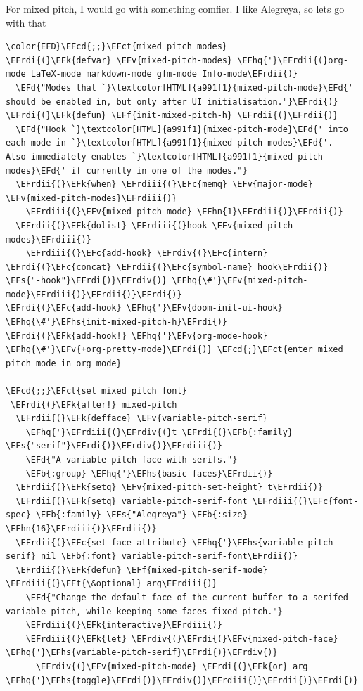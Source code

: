 \documentclass{scrartcl}
\newcommand{\EFk}[1]{\textcolor{EFk}{#1}} %
\newcommand{\EFd}[1]{\textcolor{EFd}{#1}} %
\newcommand{\EFt}[1]{\textcolor{EFt}{#1}} %
\newcommand{\EFs}[1]{\textcolor{EFs}{#1}} %
\newcommand{\EFb}[1]{\textcolor{EFb}{#1}} %
\newcommand{\EFct}[1]{\textcolor{EFct}{#1}} %
\newcommand{\EFc}[1]{\textcolor{EFc}{#1}} %
\newcommand{\EFv}[1]{\textcolor{EFv}{#1}} %
\newcommand{\EFf}[1]{\textcolor{EFf}{#1}} %
\newcommand{\EFcd}[1]{\textcolor{EFcd}{#1}} %
\newcommand{\EFhn}[1]{#1} %
\newcommand{\EFhq}[1]{#1} %
\newcommand{\EFhs}[1]{#1} %
\newcommand{\EFrdi}[1]{#1} %
\newcommand{\EFrdii}[1]{#1} %
\newcommand{\EFrdiii}[1]{#1} %
\newcommand{\EFrdiv}[1]{#1} %
\begin{document}
For mixed pitch, I would go with something comfier. I like Alegreya, so lets go with that
\begin{Code}
\begin{Verbatim}[]
\color{EFD}\EFcd{;;}\EFct{mixed pitch modes}
\EFrdi{(}\EFk{defvar} \EFv{mixed-pitch-modes} \EFhq{'}\EFrdii{(}org-mode LaTeX-mode markdown-mode gfm-mode Info-mode\EFrdii{)}
  \EFd{"Modes that `}\textcolor[HTML]{a991f1}{mixed-pitch-mode}\EFd{' should be enabled in, but only after UI initialisation."}\EFrdi{)}
\EFrdi{(}\EFk{defun} \EFf{init-mixed-pitch-h} \EFrdii{(}\EFrdii{)}
  \EFd{"Hook `}\textcolor[HTML]{a991f1}{mixed-pitch-mode}\EFd{' into each mode in `}\textcolor[HTML]{a991f1}{mixed-pitch-modes}\EFd{'.
Also immediately enables `}\textcolor[HTML]{a991f1}{mixed-pitch-modes}\EFd{' if currently in one of the modes."}
  \EFrdii{(}\EFk{when} \EFrdiii{(}\EFc{memq} \EFv{major-mode} \EFv{mixed-pitch-modes}\EFrdiii{)}
    \EFrdiii{(}\EFv{mixed-pitch-mode} \EFhn{1}\EFrdiii{)}\EFrdii{)}
  \EFrdii{(}\EFk{dolist} \EFrdiii{(}hook \EFv{mixed-pitch-modes}\EFrdiii{)}
    \EFrdiii{(}\EFc{add-hook} \EFrdiv{(}\EFc{intern} \EFrdi{(}\EFc{concat} \EFrdii{(}\EFc{symbol-name} hook\EFrdii{)} \EFs{"-hook"}\EFrdi{)}\EFrdiv{)} \EFhq{\#'}\EFv{mixed-pitch-mode}\EFrdiii{)}\EFrdii{)}\EFrdi{)}
\EFrdi{(}\EFc{add-hook} \EFhq{'}\EFv{doom-init-ui-hook} \EFhq{\#'}\EFhs{init-mixed-pitch-h}\EFrdi{)}
\EFrdi{(}\EFk{add-hook!} \EFhq{'}\EFv{org-mode-hook} \EFhq{\#'}\EFv{+org-pretty-mode}\EFrdi{)} \EFcd{;}\EFct{enter mixed pitch mode in org mode}

\EFcd{;;}\EFct{set mixed pitch font}
 \EFrdi{(}\EFk{after!} mixed-pitch
  \EFrdii{(}\EFk{defface} \EFv{variable-pitch-serif}
    \EFhq{'}\EFrdiii{(}\EFrdiv{(}t \EFrdi{(}\EFb{:family} \EFs{"serif"}\EFrdi{)}\EFrdiv{)}\EFrdiii{)}
    \EFd{"A variable-pitch face with serifs."}
    \EFb{:group} \EFhq{'}\EFhs{basic-faces}\EFrdii{)}
  \EFrdii{(}\EFk{setq} \EFv{mixed-pitch-set-height} t\EFrdii{)}
  \EFrdii{(}\EFk{setq} variable-pitch-serif-font \EFrdiii{(}\EFc{font-spec} \EFb{:family} \EFs{"Alegreya"} \EFb{:size} \EFhn{16}\EFrdiii{)}\EFrdii{)}
  \EFrdii{(}\EFc{set-face-attribute} \EFhq{'}\EFhs{variable-pitch-serif} nil \EFb{:font} variable-pitch-serif-font\EFrdii{)}
  \EFrdii{(}\EFk{defun} \EFf{mixed-pitch-serif-mode} \EFrdiii{(}\EFt{\&optional} arg\EFrdiii{)}
    \EFd{"Change the default face of the current buffer to a serifed variable pitch, while keeping some faces fixed pitch."}
    \EFrdiii{(}\EFk{interactive}\EFrdiii{)}
    \EFrdiii{(}\EFk{let} \EFrdiv{(}\EFrdi{(}\EFv{mixed-pitch-face} \EFhq{'}\EFhs{variable-pitch-serif}\EFrdi{)}\EFrdiv{)}
      \EFrdiv{(}\EFv{mixed-pitch-mode} \EFrdi{(}\EFk{or} arg \EFhq{'}\EFhs{toggle}\EFrdi{)}\EFrdiv{)}\EFrdiii{)}\EFrdii{)}\EFrdi{)}
\end{Verbatim}
\end{Code}
\end{document}
